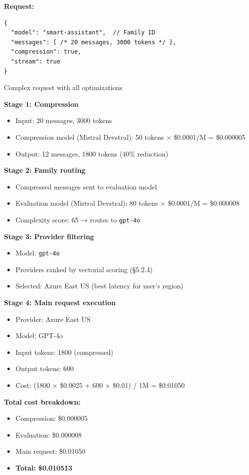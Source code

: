 \documentclass[english]{article}
\begin{document}
\textbf{Request:}
\begin{listing}[H]
\begin{verbatim}
{
  "model": "smart-assistant",  // Family ID
  "messages": [ /* 20 messages, 3000 tokens */ ],
  "compression": true,
  "stream": true
}
\end{verbatim}
\caption{Complex request with all optimizations}
\end{listing}

\textbf{Stage 1: Compression}
\begin{itemize}
    \item Input: 20 messages, 3000 tokens
    \item Compression model (Mistral Devstral): 50 tokens × \$0.0001/M = \$0.000005
    \item Output: 12 messages, 1800 tokens (40\% reduction)
\end{itemize}

\textbf{Stage 2: Family routing}
\begin{itemize}
    \item Compressed messages sent to evaluation model
    \item Evaluation model (Mistral Devstral): 80 tokens × \$0.0001/M = \$0.000008
    \item Complexity score: 65 → routes to \texttt{gpt-4o}
\end{itemize}

\textbf{Stage 3: Provider filtering}
\begin{itemize}
    \item Model: \texttt{gpt-4o}
    \item Providers ranked by vectorial scoring (§5.2.4)
    \item Selected: Azure East US (best latency for user's region)
\end{itemize}

\textbf{Stage 4: Main request execution}
\begin{itemize}
    \item Provider: Azure East US
    \item Model: GPT-4o
    \item Input tokens: 1800 (compressed)
    \item Output tokens: 600
    \item Cost: (1800 × \$0.0025 + 600 × \$0.01) / 1M = \$0.01050
\end{itemize}

\textbf{Total cost breakdown:}
\begin{itemize}
    \item Compression: \$0.000005
    \item Evaluation: \$0.000008
    \item Main request: \$0.01050
    \item \textbf{Total: \$0.010513}
\end{itemize}
\end{document}
